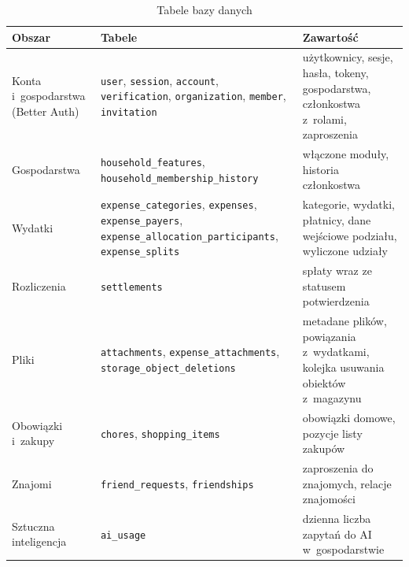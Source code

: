 \begin{table}[H]
  \centering
  \caption{Tabele bazy danych}
  \label{tab:tabele}
  \begin{tabularx}{\textwidth}{@{}>{\raggedright\arraybackslash}p{}>{\raggedright\arraybackslash}p{}L@{}}
    \toprule
    Obszar & Tabele & Zawartość \\
    \midrule
    Konta i~gospodarstwa (Better Auth) & \texttt{user}, \texttt{session}, \texttt{account}, \texttt{verification}, \texttt{organization}, \texttt{member}, \texttt{invitation} & użytkownicy, sesje, hasła, tokeny, gospodarstwa, członkostwa z~rolami, zaproszenia \\
    Gospodarstwa & \texttt{household\_features}, \texttt{household\_membership\_history} & włączone moduły, historia członkostwa \\
    Wydatki & \texttt{expense\_categories}, \texttt{expenses}, \texttt{expense\_payers}, \texttt{expense\_allocation\_participants}, \texttt{expense\_splits} & kategorie, wydatki, płatnicy, dane wejściowe podziału, wyliczone udziały \\
    Rozliczenia & \texttt{settlements} & spłaty wraz ze statusem potwierdzenia \\
    Pliki & \texttt{attachments}, \texttt{expense\_attachments}, \texttt{storage\_object\_deletions} & metadane plików, powiązania z~wydatkami, kolejka usuwania obiektów z~magazynu \\
    Obowiązki i~zakupy & \texttt{chores}, \texttt{shopping\_items} & obowiązki domowe, pozycje listy zakupów \\
    Znajomi & \texttt{friend\_requests}, \texttt{friendships} & zaproszenia do znajomych, relacje znajomości \\
    Sztuczna inteligencja & \texttt{ai\_usage} & dzienna liczba zapytań do AI w~gospodarstwie \\
    \bottomrule
  \end{tabularx}
\end{table}

